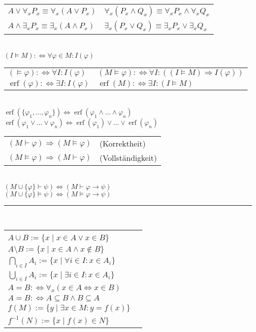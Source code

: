 \documentclass[a4paper,10pt,fleqn,twoside,twocolumn]{scrartcl}
\newcommand{\erf}{\operatorname{erf}}
\begin{document}
\noindent
\begin{tabular}{@{}l|l}
$A\lor\forall_{\!x} P_x \equiv \forall_{\!x}(A\lor P_x)$
&$\forall_{\!x}(P_x\land Q_x) \equiv \forall_{\!x}P_x\land\forall_{\!x}Q_x$\\
$A\land\exists_x P_x \equiv \exists_x(A\land P_x)$
&$\exists_{x}(P_x\lor Q_x) \equiv \exists_x P_x\lor\exists_x Q_x$
\end{tabular}\\
$(I\models M) :\Leftrightarrow \forall\varphi{\in}M\colon I(\varphi)$\\
\begin{tabular}{@{}l|l}
$(\models\varphi) :\Leftrightarrow \forall I\colon I(\varphi)$
& $(M\models\varphi) :\Leftrightarrow \forall I\colon ((I\models M)\Rightarrow I(\varphi))$\\
$\erf(\varphi) :\Leftrightarrow \exists I\colon I(\varphi)$
& $\erf(M) :\Leftrightarrow \exists I\colon (I\models M)$
\end{tabular}\\
$\erf(\{\varphi_1,\ldots,\varphi_n\}) \Leftrightarrow
\erf(\varphi_1\land\ldots\land\varphi_n)$\\
$\erf(\varphi_1\lor\ldots\lor\varphi_n) \Leftrightarrow
\erf(\varphi_1)\lor\ldots\lor\erf(\varphi_n)$\\
\begin{tabular}{@{}ll}
$(M\vdash\varphi)\Rightarrow (M\models\varphi)$ & (Korrektheit)\\
$(M\models\varphi)\Rightarrow (M\vdash\varphi)$ & (Vollständigkeit)
\end{tabular}\\
$(M\cup\{\varphi\}\vdash\psi)\Leftrightarrow (M\vdash \varphi\rightarrow\psi)$\\
$(M\cup\{\varphi\}\models\psi)\Leftrightarrow (M\models \varphi\rightarrow\psi)$\\[-4pt]
\rule{\columnwidth}{\heavyrulewidth}\\[2pt]
\begin{tabular}{@{}l@{\;\,}|@{\;\;}l}
\makecell[lt]{
$A\cap B := \{x\mid x\in A\land x\in B\}$\\
$A\cup B := \{x\mid x\in A\lor x\in B\}$\\
$A\setminus B := \{x\mid x\in A\land x\notin B\}$\\
$\bigcap_{i\in I} A_i := \{x\mid \forall i{\in}I\colon x{\in}A_i\}$\\
$\bigcup_{i\in I} A_i := \{x\mid \exists i{\in}I\colon x{\in}A_i\}$
}
&\makecell[lt]{
$A\subseteq B :\Leftrightarrow \forall_{\!x}(x\in A\Rightarrow x\in B)$\\
$A=B :\Leftrightarrow \forall_{\!x}(x\in A\Leftrightarrow x\in B)$\\
$A=B :\Leftrightarrow A\subseteq B\land B\subseteq A$\\
$f(M) := \{y\mid\exists x{\in}M\colon y{=}f(x)\}$\\
$f^{-1}(N) := \{x\mid f(x)\in N\}$
}
\end{tabular}\\
\end{document}
